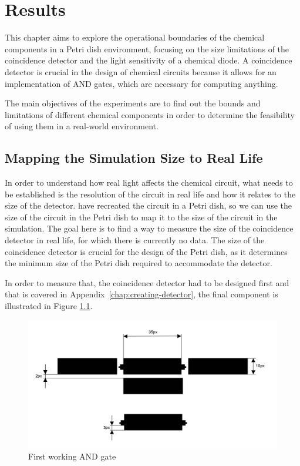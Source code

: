 \chapter{Results}
This chapter aims to explore the operational boundaries of the chemical components in a Petri dish environment, focusing on the size limitations of the coincidence detector and the light sensitivity of a chemical diode.
A coincidence detector is crucial in the design of chemical circuits because it allows for an implementation of AND gates,
which are necessary for computing anything. 

The main objectives of the experiments are to find out the bounds and limitations of different chemical components in order to determine the feasibility of using them in a real-world environment.

\section{Mapping the Simulation Size to Real Life}
In order to understand how real light affects the chemical circuit, what needs to be established is the resolution of the circuit in real life and how it relates to the size of the detector. \cite{gorecki2003chemical} have recreated the circuit in a Petri dish, so we can use the size of the circuit in the Petri dish to map it to the size of the circuit in the simulation.
The goal here is to find a way to measure the size of the coincidence detector in real life, for which there is currently no data. The size of the coincidence detector is crucial for the design of the Petri dish, as it determines the minimum size of the Petri dish required to accommodate the detector. 

In order to measure that, the coincidence detector had to be designed first and that is covered in Appendix~\ref{chap:creating-detector}, the final component is illustrated in Figure \ref{fig:and-gate}.


\begin{figure}
    \centering
    \includegraphics[width=1\linewidth]{measurement-and.jpg}
    \caption{First working AND gate}
    \label{fig:and-gate}
\end{figure}

